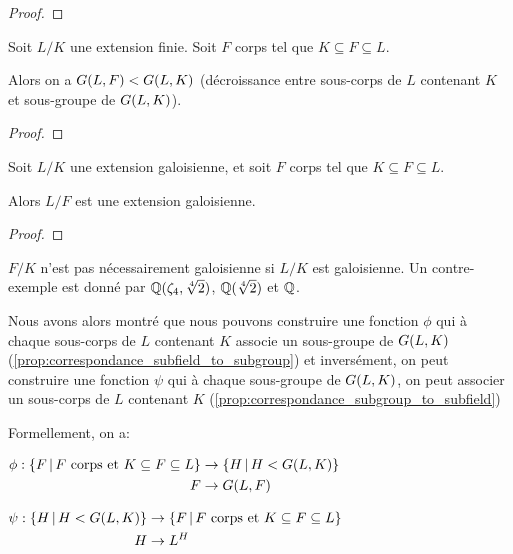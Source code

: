 \ifdefined\outputproof
\begin{proof}

\end{proof}
\fi

\begin{proposition}
	\label{prop:correspondance_subfield_to_subgroup}
	Soit $L/K$ une extension finie.
	Soit $F$ corps tel que $K \subseteq F \subseteq L$.

	Alors on a $G(L, F) < G(L, K)$ (décroissance entre
	sous-corps de $L$ contenant $K$ et sous-groupe de $G(L, K)$).
\end{proposition}

\ifdefined\outputproof
\begin{proof}

\end{proof}
\fi

\begin{proposition}
	Soit $L/K$ une extension galoisienne, et soit $F$ corps tel que $K \subseteq
	F \subseteq L$.

	Alors $L/F$ est une extension galoisienne.
\end{proposition}

\ifdefined\outputproof
\begin{proof}

\end{proof}
\fi

\begin{remarque}
	$F/K$ n'est pas nécessairement galoisienne si $L/K$ est
	galoisienne. Un contre-exemple est donné par $\mathbb{Q}(\zeta_{4},
	\sqrt[4]{2})$, $\mathbb{Q}(\sqrt[4]{2})$ et $\mathbb{Q}$.
\end{remarque}

Nous avons alors montré que nous pouvons construire une fonction $\phi$ qui à
chaque sous-corps de $L$ contenant $K$ associe un sous-groupe de
$G(L, K)$ (\ref{prop:correspondance_subfield_to_subgroup}) et
inversément, on peut construire une fonction $\psi$ qui à chaque sous-groupe de
$G(L, K)$, on peut associer un sous-corps de $L$ contenant $K$
(\ref{prop:correspondance_subgroup_to_subfield})

Formellement, on a:

\begin{center}
	$
	\begin{aligned}
		\phi :
			\left\{F \, | \, F \text{ corps et } K \subseteq F \subseteq L \right\}
			&\rightarrow \left\{H \, | \, H < G(L, K) \right\}
			\\
			F &\rightarrow G(L, F)
	\end{aligned}
	$

	$
	\begin{aligned}
		\psi :
			\left\{H \, | \, H < G(L, K) \right\}
			&\rightarrow
			\left\{F \, | \, F \text{ corps et } K \subseteq F \subseteq L \right\}
			\\
			H &\rightarrow L^{H}
	\end{aligned}
	$
\end{center}

